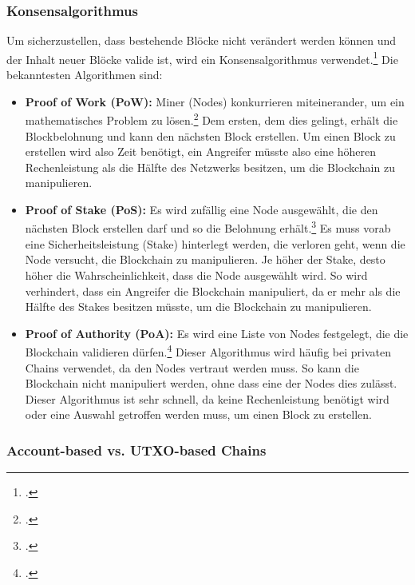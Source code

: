 \subsubsection{Konsensalgorithmus}
\label{sec:definition-konsensalgorithmus}
Um sicherzustellen, dass bestehende Blöcke nicht verändert werden können und der Inhalt neuer Blöcke valide ist, wird ein Konsensalgorithmus verwendet.\footcite[Vgl.][S. 2 f\adddot]{q4}
Die bekanntesten Algorithmen sind:
\begin{itemize}
    \item \textbf{Proof of Work (PoW):}
    Miner (Nodes) konkurrieren miteinerander, um ein mathematisches Problem zu lösen.\footcite[Vgl. hierzu und im Folgenden][3]{q4}
    Dem ersten, dem dies gelingt, erhält die Blockbelohnung und kann den nächsten Block erstellen.
    Um einen Block zu erstellen wird also Zeit benötigt, ein Angreifer müsste also eine höheren Rechenleistung als die Hälfte des Netzwerks besitzen, um die Blockchain zu manipulieren.

    \item \textbf{Proof of Stake (PoS):}
    Es wird zufällig eine Node ausgewählt, die den nächsten Block erstellen darf und so die Belohnung erhält.\footcite[Vgl. hierzu und im Folgenden][2]{q7}
    Es muss vorab eine Sicherheitsleistung (Stake) hinterlegt werden, die verloren geht, wenn die Node versucht, die Blockchain zu manipulieren. 
    Je höher der Stake, desto höher die Wahrscheinlichkeit, dass die Node ausgewählt wird.
    So wird verhindert, dass ein Angreifer die Blockchain manipuliert, da er mehr als die Hälfte des Stakes besitzen müsste, um die Blockchain zu manipulieren.

    \item \textbf{Proof of Authority (PoA):}
    Es wird eine Liste von Nodes festgelegt, die die Blockchain validieren dürfen.\footcite[Vgl. hierzu und im Folgenden][]{w14}
    Dieser Algorithmus wird häufig bei privaten Chains verwendet, da den Nodes vertraut werden muss.
    So kann die Blockchain nicht manipuliert werden, ohne dass eine der Nodes dies zulässt.
    Dieser Algorithmus ist sehr schnell, da keine Rechenleistung benötigt wird oder eine Auswahl getroffen werden muss, um einen Block zu erstellen.
    
\end{itemize}

\subsubsection{Account-based vs. UTXO-based Chains}
\label{sec:definition-account-based-vs-utxo-based-chains}


